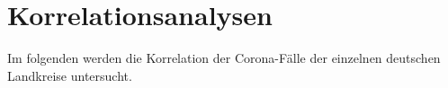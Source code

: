 \section{Korrelationsanalysen}
Im folgenden werden die Korrelation der Corona-Fälle der einzelnen deutschen Landkreise untersucht.